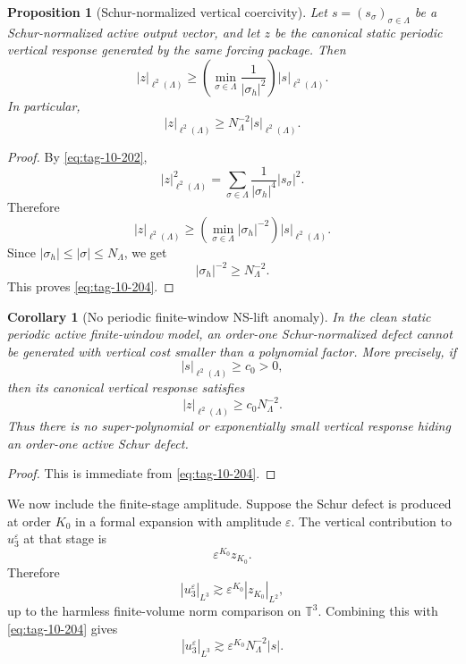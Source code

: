 \documentclass[11pt]{article}
\numberwithin{equation}{section}
\newtheorem{proposition}[theorem]{Proposition}
\newtheorem{corollary}[theorem]{Corollary}
\begin{document}
\begin{proposition}[Schur-normalized vertical coercivity]
Let \(s=(s_\sigma)_{\sigma\in\Lambda}\) be a Schur-normalized active output vector, and let \(z\) be the canonical static periodic vertical response generated by the same forcing package. Then
\begin{equation}
|z|_{\ell^2(\Lambda)}
\ge
\left(
\min_{\sigma\in\Lambda}
\frac1{|\sigma_h|^2}
\right)
|s|_{\ell^2(\Lambda)}.
\label{eq:tag-10-203}
\end{equation}
In particular,
\begin{equation}
|z|_{\ell^2(\Lambda)}
\ge
N_\Lambda^{-2}
|s|_{\ell^2(\Lambda)}.
\label{eq:tag-10-204}
\end{equation}

\end{proposition}

\begin{proof}
By \eqref{eq:tag-10-202},
\[
|z|_{\ell^2(\Lambda)}^2 =
\sum_{\sigma\in\Lambda}
\frac{1}{|\sigma_h|^4}|s_\sigma|^2.
\]
Therefore
\[
|z|_{\ell^2(\Lambda)}
\ge
\left(
\min_{\sigma\in\Lambda}
|\sigma_h|^{-2}
\right)
|s|_{\ell^2(\Lambda)}.
\]
Since \(|\sigma_h|\le|\sigma|\le N_\Lambda\), we get
\[
|\sigma_h|^{-2}\ge N_\Lambda^{-2}.
\]
This proves \eqref{eq:tag-10-204}.
\end{proof}

\begin{corollary}[No periodic finite-window NS-lift anomaly]
In the clean static periodic active finite-window model, an order-one Schur-normalized defect cannot be generated with vertical cost smaller than a polynomial factor. More precisely, if
\[
|s|_{\ell^2(\Lambda)}\ge c_0>0,
\]
then its canonical vertical response satisfies
\begin{equation}
|z|_{\ell^2(\Lambda)}
\ge
c_0N_\Lambda^{-2}.
\label{eq:tag-10-205}
\end{equation}
Thus there is no super-polynomial or exponentially small vertical response hiding an order-one active Schur defect.

\end{corollary}

\begin{proof}
This is immediate from \eqref{eq:tag-10-204}.
\end{proof}

We now include the finite-stage amplitude. Suppose the Schur defect is produced at order \(K_0\) in a formal expansion with amplitude \(\varepsilon\). The vertical contribution to \(u_3^\varepsilon\) at that stage is
\[
\varepsilon^{K_0}z_{K_0}.
\]
Therefore
\[
|u_3^\varepsilon|_{L^3}
\gtrsim
\varepsilon^{K_0}|z_{K_0}|_{L^2},
\]
up to the harmless finite-volume norm comparison on \(\mathbb T^3\). Combining this with \eqref{eq:tag-10-204} gives
\begin{equation}
|u_3^\varepsilon|_{L^3}
\gtrsim
\varepsilon^{K_0}N_\Lambda^{-2}|s|.
\label{eq:tag-10-206}
\end{equation}
\end{document}
